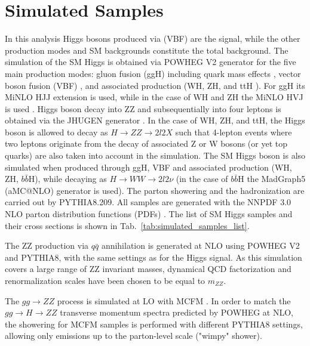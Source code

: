 \section{Simulated Samples}
In this analysis Higgs bosons produced via (VBF) are the signal, while the other production modes and SM backgrounds constitute the total background. The simulation of the SM Higgs is obtained via POWHEG V2 \cite{bib:JHEP_07_2008_060,bib:JHEP_11_2007_070} generator for the five main production modes: gluon fusion (ggH) including quark mass effects \cite{bib:JHEP_02_2012_088}, vector boson fusion (VBF) \cite{bib:JHEP_02_2010_037}, and associated production (WH, ZH, and ttH \cite{bib:PhysRev_D91_2015_9_094003}). For ggH its MiNLO HJJ extension is used, while in the case of WH and ZH the MiNLO HVJ is used \cite{bib:JHEP_10_2013_083}. Higgs boson decay into ZZ and subsequentially into four leptons is obtained via the JHUGEN generator \cite{bib:PhysRev_D81_2010_075022}. In the case of WH, ZH, and ttH, the Higgs boson is allowed to decay as $H \rightarrow ZZ \rightarrow 2l2X$ such that 4-lepton events where two leptons originate from the decay of associated Z or W bosons (or yet top quarks) are also taken into account in the simulation. The SM Higgs boson is also simulated when produced through ggH, VBF and associated production (WH, ZH, $b\bar{b}$H), while decaying as $H \rightarrow WW \rightarrow 2l2\nu$ (in the case of $b\bar{b}$H the MadGraph5 (aMC@NLO) generator is used). The parton showering and the hadronization are carried out by PYTHIA8.209. All samples are generated with the NNPDF 3.0 NLO parton distribution functions (PDFs) \cite{bib:JHEP_04_2015_040}. The list of SM Higgs samples and their cross sections is shown in Tab.~\ref{tab:simulated_samples_list}.

The ZZ production via $q\bar{q}$ annihilation is generated at NLO using POWHEG V2 \cite{bib:EurPhysJ_C74_2014_1_2702} and PYTHIA8, with the same settings as for the Higgs signal. As this simulation covers a large range of ZZ invariant masses, dynamical QCD factorization and renormalization scales have been chosen to be equal to $m_{ZZ}$.

The $gg \rightarrow ZZ$ process is simulated at LO with MCFM \cite{bib:NuclPhysProcSuppl_205_2010_10, bib:JHEP_04_2014_060}. In order to match the $gg \rightarrow H \rightarrow ZZ$ transverse momentum spectra predicted by POWHEG at NLO, the showering for MCFM samples is performed with different PYTHIA8 settings, allowing only emissions up to the parton-level scale ("wimpy" shower).

